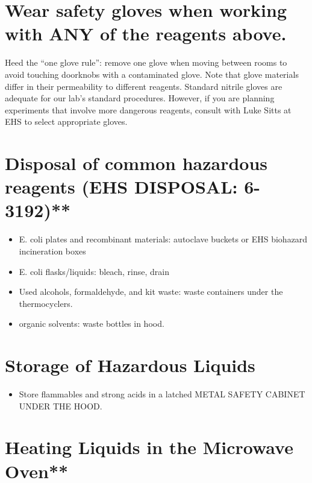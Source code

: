\documentclass[
]{book}
\providecommand{\tightlist}{%
  \setlength{\itemsep}{0pt}\setlength{\parskip}{0pt}}
\begin{document}
\hypertarget{wear-safety-gloves-when-working-with-any-of-the-reagents-above.}{%
\section{Wear safety gloves when working with ANY of the reagents above.}\label{wear-safety-gloves-when-working-with-any-of-the-reagents-above.}}

Heed the ``one glove rule'': remove one glove when moving between rooms to avoid touching doorknobs with a contaminated glove. Note that glove materials differ in their permeability to different reagents. Standard nitrile gloves are adequate for our lab's standard procedures. However, if you are planning experiments that involve more dangerous reagents, consult with Luke Sitts at EHS to select appropriate gloves.

\hypertarget{disposal-of-common-hazardous-reagents-ehs-disposal-6-3192}{%
\section{Disposal of common hazardous reagents (EHS DISPOSAL: 6-3192)**}\label{disposal-of-common-hazardous-reagents-ehs-disposal-6-3192}}

\begin{itemize}
\item
  E. coli plates and recombinant materials: autoclave buckets or EHS biohazard incineration boxes
\item
  E. coli flasks/liquids: bleach, rinse, drain
\item
  Used alcohols, formaldehyde, and kit waste: waste containers under the thermocyclers.
\item
  organic solvents: waste bottles in hood.
\end{itemize}

\hypertarget{storage-of-hazardous-liquids}{%
\section{\texorpdfstring{Storage \textbf{of Hazardous Liquids}}{Storage of Hazardous Liquids}}\label{storage-of-hazardous-liquids}}

\begin{itemize}
\tightlist
\item
  Store flammables and strong acids in a latched METAL SAFETY CABINET UNDER THE HOOD.
\end{itemize}

\hypertarget{heating-liquids-in-the-microwave-oven}{%
\section{Heating Liquids in the Microwave Oven**}\label{heating-liquids-in-the-microwave-oven}}
\end{document}
